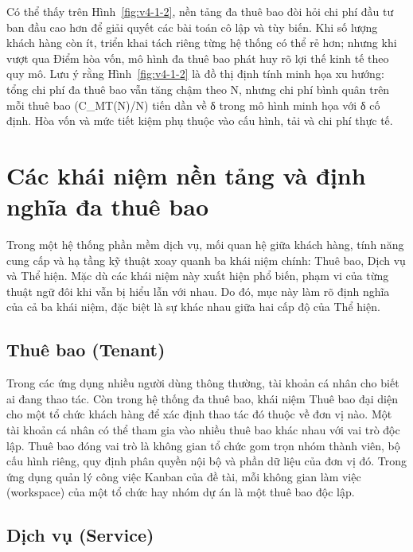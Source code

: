 
Có thể thấy trên Hình~\ref{fig:v4-1-2}, nền tảng đa thuê bao đòi hỏi chi phí đầu tư ban đầu cao hơn để giải quyết các bài toán cô lập và tùy biến. Khi số lượng khách hàng còn ít, triển khai tách riêng từng hệ thống có thể rẻ hơn; nhưng khi vượt qua Điểm hòa vốn, mô hình đa thuê bao phát huy rõ lợi thế kinh tế theo quy mô. Lưu ý rằng Hình~\ref{fig:v4-1-2} là đồ thị định tính minh họa xu hướng: tổng chi phí đa thuê bao vẫn tăng chậm theo N, nhưng chi phí bình quân trên mỗi thuê bao (C\_\allowbreak{}MT(N)/N) tiến dần về δ trong mô hình minh họa với δ cố định. Hòa vốn và mức tiết kiệm phụ thuộc vào cấu hình, tải và chi phí thực tế.

\section{Các khái niệm nền tảng và định nghĩa đa thuê bao}\label{v4-sec-1-2}

Trong một hệ thống phần mềm dịch vụ, mối quan hệ giữa khách hàng, tính năng cung cấp và hạ tầng kỹ thuật xoay quanh ba khái niệm chính: Thuê bao, Dịch vụ và Thể hiện. Mặc dù các khái niệm này xuất hiện phổ biến, phạm vi của từng thuật ngữ đôi khi vẫn bị hiểu lẫn với nhau. Do đó, mục này làm rõ định nghĩa của cả ba khái niệm, đặc biệt là sự khác nhau giữa hai cấp độ của Thể hiện.

\subsection{Thuê bao (Tenant)}\label{v4-sec-1-2-1}

Trong các ứng dụng nhiều người dùng thông thường, tài khoản cá nhân cho biết ai đang thao tác. Còn trong hệ thống đa thuê bao, khái niệm Thuê bao đại diện cho một tổ chức khách hàng để xác định thao tác đó thuộc về đơn vị nào. Một tài khoản cá nhân có thể tham gia vào nhiều thuê bao khác nhau với vai trò độc lập. Thuê bao đóng vai trò là không gian tổ chức gom trọn nhóm thành viên, bộ cấu hình riêng, quy định phân quyền nội bộ và phần dữ liệu của đơn vị đó. Trong ứng dụng quản lý công việc Kanban của đề tài, mỗi không gian làm việc (workspace) của một tổ chức hay nhóm dự án là một thuê bao độc lập.

\subsection{Dịch vụ (Service)}\label{v4-sec-1-2-2}

